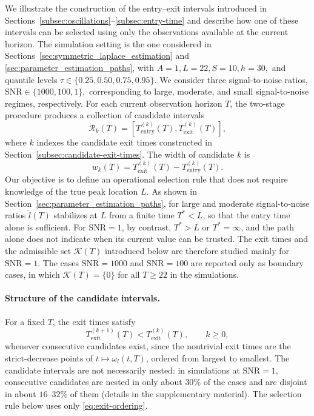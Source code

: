 \documentclass[12pt,a4paper]{article}
\begin{document}
We illustrate the construction of the entry--exit intervals introduced
in Sections~\ref{subsec:oscillations}--\ref{subsec:entry-time} and
describe how one of these intervals can be selected using only the
observations available at the current horizon. The simulation setting
is the one considered in
Sections~\ref{sec:symmetric_laplace_estimation} and
\ref{sec:parameter_estimation_paths}, with
\(
A=1,
L=22,
S=10,
h=30,
\)
and quantile levels
\(
\tau\in\{0.25,0.50,0.75,0.95\}.
\)
We consider three signal-to-noise ratios,
\(
\mathrm{SNR}\in\{1000,100,1\},
\)
corresponding to large, moderate, and small signal-to-noise regimes,
respectively.
For each current observation horizon $T$, the two-stage procedure
produces a collection of candidate intervals
\[
\mathcal R_k(T)
=
\left[
T_{\mathrm{entry}}^{(k)}(T),
T_{\mathrm{exit}}^{(k)}(T)
\right],
\]
where $k$ indexes the candidate exit times constructed in
Section~\ref{subsec:candidate-exit-times}. The width of candidate
$k$ is
\[
w_k(T)
=
T_{\mathrm{exit}}^{(k)}(T)
-
T_{\mathrm{entry}}^{(k)}(T).
\]
Our objective is to define an operational selection rule that does
not require knowledge of the true peak location $L$.
As shown in Section~\ref{sec:parameter_estimation_paths}, for large and
moderate signal-to-noise ratios $\widehat l(T)$ stabilizes at $L$ from a
finite time $T^{*}<L$, so that the entry time alone is sufficient. For
$\mathrm{SNR}=1$, by contrast, $T^{*}>L$ or $T^{*}=\infty$, and the path
alone does not indicate when its current value can be trusted. The exit
times and the admissible set $\mathcal K(T)$ introduced below are
therefore studied mainly for $\mathrm{SNR}=1$. The cases
$\mathrm{SNR}=1000$ and $\mathrm{SNR}=100$ are reported only as boundary
cases, in which $\mathcal K(T)=\{0\}$ for all $T\geq 22$ in the
simulations.

{\color{blue}
\paragraph{Structure of the candidate intervals.}
For a fixed $T$, the exit times satisfy
\begin{equation}
	T_{\mathrm{exit}}^{(k+1)}(T)
	<
	T_{\mathrm{exit}}^{(k)}(T),
	\qquad k \geq 0,
	\label{eq:exit-ordering}
\end{equation}
whenever consecutive candidates exist, since the nontrivial exit times
are the strict-decrease points of $t \mapsto \omega_l(t,T)$, ordered
from largest to smallest. The candidate intervals are not necessarily
nested: in simulations at $\mathrm{SNR}=1$, consecutive candidates are
nested in only about $30\%$ of the cases and are disjoint in about
$16$--$32\%$ of them (details in the supplementary material). The
selection rule below uses only \eqref{eq:exit-ordering}.}
\end{document}
